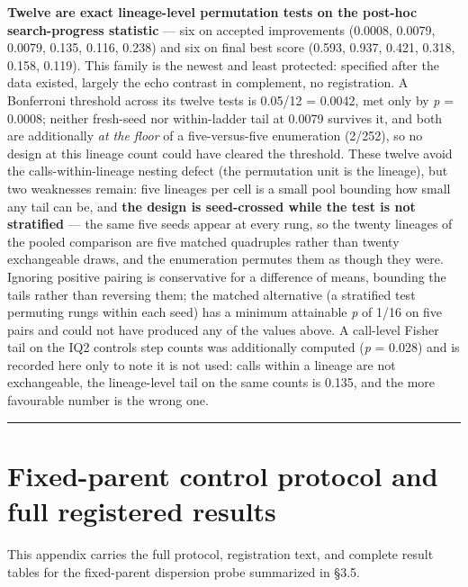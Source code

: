 \textbf{Twelve are exact lineage-level permutation tests on the post-hoc search-progress statistic} --- six on accepted improvements (0.0008, 0.0079, 0.0079, 0.135, 0.116, 0.238) and six on final best score (0.593, 0.937, 0.421, 0.318, 0.158, 0.119). This family is the newest and least protected: specified after the data existed, largely the echo contrast in complement, no registration. A Bonferroni threshold across its twelve tests is 0.05/12 = 0.0042, met only by \emph{p} = 0.0008; neither fresh-seed nor within-ladder tail at 0.0079 survives it, and both are additionally \emph{at the floor} of a five-versus-five enumeration (2/252), so no design at this lineage count could have cleared the threshold. These twelve avoid the calls-within-lineage nesting defect (the permutation unit is the lineage), but two weaknesses remain: five lineages per cell is a small pool bounding how small any tail can be, and \textbf{the design is seed-crossed while the test is not stratified} --- the same five seeds appear at every rung, so the twenty lineages of the pooled comparison are five matched quadruples rather than twenty exchangeable draws, and the enumeration permutes them as though they were. Ignoring positive pairing is conservative for a difference of means, bounding the tails rather than reversing them; the matched alternative (a stratified test permuting rungs within each seed) has a minimum attainable \emph{p} of 1/16 on five pairs and could not have produced any of the values above. A call-level Fisher tail on the IQ2 control\textquotesingle s step counts was additionally computed (\emph{p} = 0.028) and is recorded here only to note it is not used: calls within a lineage are not exchangeable, the lineage-level tail on the same counts is 0.135, and the more favourable number is the wrong one.

\begin{center}\rule{0.5\linewidth}{0.5pt}\end{center}

\hypertarget{fixed-parent-control-protocol-and-full-registered-results}{%
\section{Fixed-parent control protocol and full registered results}\label{fixed-parent-control-protocol-and-full-registered-results}}

This appendix carries the full protocol, registration text, and complete result tables for the fixed-parent dispersion probe summarized in §3.5.

